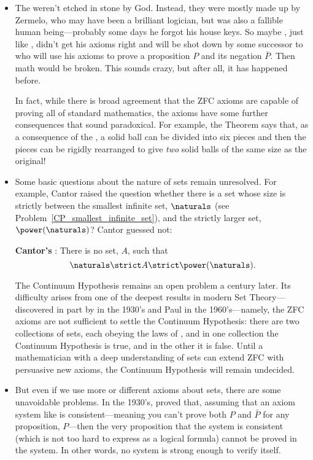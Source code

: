 %
\begin{itemize}

\item The  weren't etched in stone by God.  Instead, they
  were mostly made up by Zermelo, who may have been a brilliant logician,
  but was also a fallible human being---probably some days he forgot his
  house keys.  So maybe , just like , didn't get
  his axioms right and will be shot down by some successor to
   who will use his axioms to prove a proposition $P$ and its
  negation $\bar{P}$.  Then math would be broken.  This sounds crazy, but
  after all, it has happened before.

  In fact, while there is broad agreement that the ZFC axioms are capable
  of proving all of standard mathematics, the axioms have some further
  consequences that sound paradoxical.  For example, the
   Theorem says that, as a consequence of the
  , a solid ball can be divided into six pieces and
  then the pieces can be rigidly rearranged to give \emph{two} solid balls
  of the same size as the original!

\item Some basic questions about the nature of sets remain unresolved.
  For example, Cantor raised the question whether there is a set whose
  size is strictly between the smallest infinite set, $\naturals$ (see
  Problem~\ref{CP_smallest_infinite_set}), and the strictly larger
  set, $\power(\naturals)$?  Cantor guessed not:

  \textbf{Cantor's }: There is no set, $A$,
  such that
  \[
  \naturals \strict A \strict \power(\naturals).
  \]

  The Continuum Hypothesis remains an open problem a century later.
  Its difficulty arises from one of the deepest results in modern Set
  Theory---discovered in part by  in the 1930's and Paul
   in the 1960's---namely, the ZFC axioms are not
  sufficient to settle the Continuum Hypothesis: there are two
  collections of sets, each obeying the laws of , and in one
  collection the Continuum Hypothesis is true, and in the other it is
  false.  Until a mathematician with a deep understanding of sets can
  extend ZFC with persuasive new axioms, the Continuum Hypothesis will
  remain undecided.  \iffalse So settling the Continuum Hypothesis
  some new understanding of what Sets should be to arrive at
  persuasive new axioms that extend ZFC and are strong enough to
  determine the truth of the Continuum Hypothesis one way or the
  other.  \fi
\item But even if we use more or different axioms about sets, there
  are some unavoidable problems.  In the 1930's,  proved
  that, assuming that an axiom system like  is
  consistent---meaning you can't prove both $P$ and $\bar{P}$ for any
  proposition, $P$---then the very proposition that the system is
  consistent (which is not too hard to express as a logical formula)
  cannot be proved in the system.  In other words, no 
  system is strong enough to verify itself.
  
\end{itemize}


